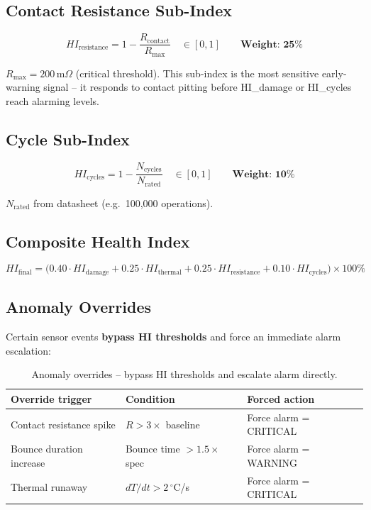 \documentclass[12pt,a4paper]{article}
\begin{document}
\subsection{Contact Resistance Sub-Index}

\[
HI_{\text{resistance}} = 1 - \frac{R_{\text{contact}}}{R_{\text{max}}}
\quad\in[0,1]
\qquad \textbf{Weight: 25\%}
\]

$R_{\text{max}} = 200$\,m$\Omega$ (critical threshold). This sub-index is the most sensitive early-warning
signal -- it responds to contact pitting before HI\_damage or HI\_cycles reach alarming levels.

\subsection{Cycle Sub-Index}

\[
HI_{\text{cycles}} = 1 - \frac{N_{\text{cycles}}}{N_{\text{rated}}}
\quad\in[0,1]
\qquad \textbf{Weight: 10\%}
\]

$N_{\text{rated}}$ from datasheet (e.g.\ 100{,}000 operations).

\subsection{Composite Health Index}

\begin{equation}
\boxed{
HI_{\text{final}} = \bigl(0.40 \cdot HI_{\text{damage}}
                       + 0.25 \cdot HI_{\text{thermal}}
                       + 0.25 \cdot HI_{\text{resistance}}
                       + 0.10 \cdot HI_{\text{cycles}}\bigr) \times 100\%
}
\end{equation}

\subsection{Anomaly Overrides}

Certain sensor events \textbf{bypass HI thresholds} and force an immediate alarm escalation:

\begin{table}[H]
\centering
\begin{tabularx}{\textwidth}{lXl}
\toprule
\textbf{Override trigger} & \textbf{Condition} & \textbf{Forced action} \\
\midrule
Contact resistance spike & $R > 3\times$ baseline & Force alarm = CRITICAL \\
Bounce duration increase& Bounce time $> 1.5\times$ spec & Force alarm = WARNING \\
Thermal runaway         & $dT/dt > 2\,^\circ$C/s  & Force alarm = CRITICAL \\
\bottomrule
\end{tabularx}
\caption{Anomaly overrides -- bypass HI thresholds and escalate alarm directly.}
\end{table}
\end{document}
